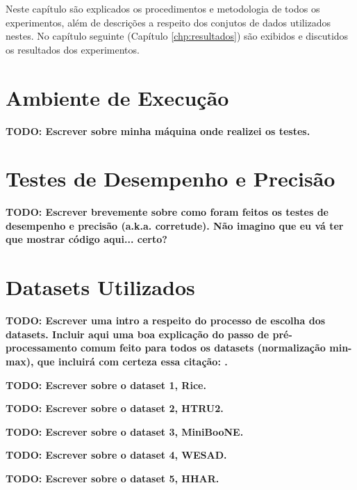 \documentclass[12pt,
openright, 
oneside, %
a4paper,    %
brazil]{facom-ufu-abntex2}
\begin{document}
Neste capítulo são explicados os procedimentos e metodologia de todos os experimentos, além de descrições a respeito dos conjutos de dados utilizados nestes. No capítulo seguinte (Capítulo \ref{chp:resultados}) são exibidos e discutidos os resultados dos experimentos.




\section{Ambiente de Execução}
\label{sec:máquinaUtilizada}

\textbf{TODO: Escrever sobre minha máquina onde realizei os testes.}




\section{Testes de Desempenho e Precisão}

\textbf{TODO: Escrever brevemente sobre como foram feitos os testes de desempenho e precisão (a.k.a. corretude). Não imagino que eu vá ter que mostrar código aqui... certo?}




\section{Datasets Utilizados}
\label{sec:datasets}

\textbf{TODO: Escrever uma intro a respeito do processo de escolha dos datasets. Incluir aqui uma boa explicação do passo de pré-processamento comum feito para todos os datasets (normalização min-max), que incluirá com certeza essa citação: \cite{standardizOfVars1988}.}

\textbf{TODO: Escrever sobre o dataset 1, Rice.}

\textbf{TODO: Escrever sobre o dataset 2, HTRU2.}

\textbf{TODO: Escrever sobre o dataset 3, MiniBooNE.}

\textbf{TODO: Escrever sobre o dataset 4, WESAD.}

\textbf{TODO: Escrever sobre o dataset 5, HHAR.}
\end{document}
